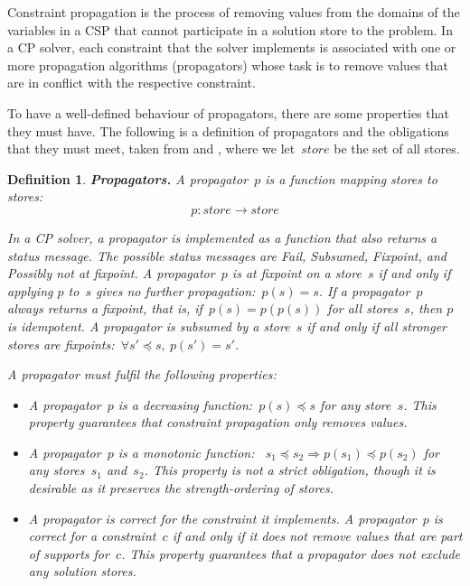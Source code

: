 \documentclass[a4paper,11pt]{article}
\newtheorem{definition}{Definition}
\newcommand{\Todo}[1]{{\color{blue}#1}}
\numberwithin{equation}{section}
\begin{document}
Constraint propagation is the process of removing values from the domains
of the variables in a CSP that cannot participate in a solution store to the 
problem. In a CP solver, each constraint that the solver implements is 
associated with 
one or more propagation algorithms (propagators) whose task is to remove
values that are in conflict with the respective constraint.

To have a well-defined behaviour of propagators, there are some properties that
they must have. The following is a definition of propagators and the obligations
that they must meet, taken from \cite{SchulteCarlsson:FDsys} and \cite{Gecode:MPG},
where we let~$store$ be the set of all stores.

\begin{definition} \label{def:prop}
  \textbf{Propagators.} A \emph{propagator}~$p$ is a function mapping stores to stores:
  \begin{equation*}
    p: store \to store
  \end{equation*}

  In a CP solver, a propagator is implemented as a function that also returns 
  a \emph{status message}.
  The possible status messages are \emph{Fail}, \emph{Subsumed},
  \emph{Fixpoint}, and \emph{Possibly not at fixpoint}. 
  A propagator~$p$ is at \emph{fixpoint} on a store~$s$ if and only if applying 
  $p$ to~$s$ gives no further propagation:~$p(s) = s$.
  If a propagator~$p$ always returns a fixpoint, that is, 
  if~$p(s) = p(p(s))$ for all stores~$s$, then $p$ is \emph{idempotent}.
  A propagator is \emph{subsumed} by a store~$s$ if and only if
  all stronger stores are fixpoints:~$\forall s'\preceq s, \ p(s')=s'$.

  A propagator must fulfil the following properties:

  \begin{itemize}
  \item A propagator~$p$ is a decreasing function:~$p(s) \preceq s$ for any store~$s$.
    This property guarantees that constraint propagation only removes values.

  \item A propagator~$p$ is a monotonic function:
    ~$s_1 \preceq s_2 \Rightarrow p(s_1) \preceq p(s_2)$
    for any stores~$s_1$ and~$s_2$. \Todo{This property is not a strict obligation,
    though it is desirable as it preserves the strength-ordering of stores.}

  \item A propagator is correct for the constraint it implements.
    A propagator~$p$
    is \emph{correct} for a constraint~$c$ if and only if it does not
    remove values that are part of supports for~$c$.
    This property guarantees that a propagator does not exclude any
    solution stores.


\end{itemize}
\end{definition}
\end{document}
